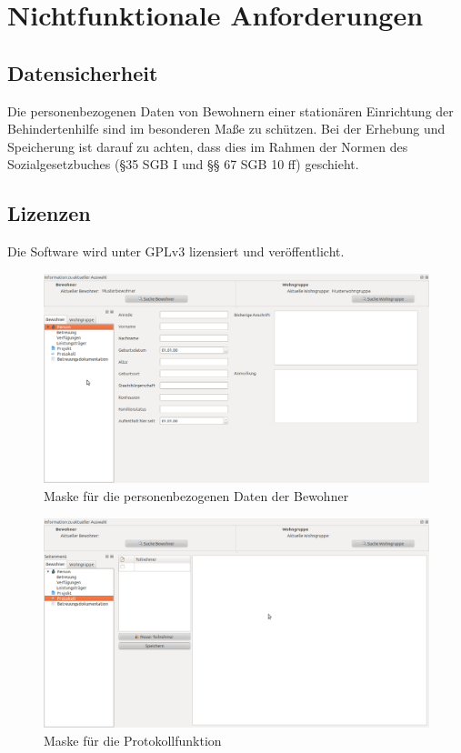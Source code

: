 \documentclass[a4paper,10pt]{article}
\begin{document}
\section{Nichtfunktionale Anforderungen}
\subsection{Datensicherheit}
Die personenbezogenen Daten von Bewohnern einer stationären Einrichtung der Behindertenhilfe sind im besonderen Maße zu schützen. Bei der Erhebung und Speicherung ist darauf zu achten, dass dies im Rahmen der Normen des Sozialgesetzbuches (§35 SGB I und §§ 67 SGB 10 ff) geschieht.
\subsection{Lizenzen}
Die Software wird unter GPLv3 lizensiert und veröffentlicht.

\begin{figure}
\includegraphics[angle=90, width=\textwidth, height=\textheight]{BewohnerInfo}
\caption{Maske für die personenbezogenen Daten der Bewohner}
\label{Info}
\end{figure}
\begin{figure}
 \includegraphics[angle=90, width=\textwidth, height=\textheight]{BewohnerProtokoll}
\caption{Maske für die Protokollfunktion}
\label{Protokoll}
\end{figure}
\end{document}
